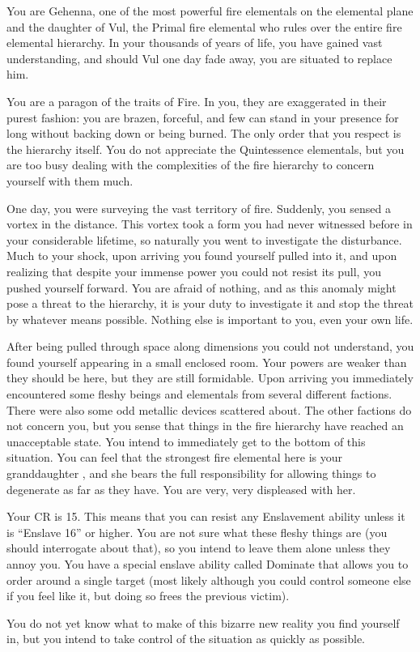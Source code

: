 \documentclass[green]{elementals}
\begin{document}
\name{\cElder{}}

You are Gehenna, one of the most powerful fire elementals on the elemental plane and the daughter of Vul, the Primal fire elemental who rules over the entire fire elemental hierarchy. In your thousands of years of life, you have gained vast understanding, and should Vul one day fade away, you are situated to replace him.

You are a paragon of the traits of Fire. In you, they are exaggerated in their purest fashion: you are brazen, forceful, and few can stand in your presence for long without backing down or being burned. The only order that you respect is the hierarchy itself. You do not appreciate the Quintessence elementals, but you are too busy dealing with the complexities of the fire hierarchy to concern yourself with them much.

One day, you were surveying the vast territory of fire. Suddenly, you sensed a vortex in the distance. This vortex took a form you had never witnessed before in your considerable lifetime, so naturally you went to investigate the disturbance. Much to your shock, upon arriving you found yourself pulled into it, and upon realizing that despite your immense power you could not resist its pull, you pushed yourself forward. You are afraid of nothing, and as this anomaly might pose a threat to the hierarchy, it is your duty to investigate it and stop the threat by whatever means possible. Nothing else is important to you, even your own life.

After being pulled through space along dimensions you could not understand, you found yourself appearing in a small enclosed room. Your powers are weaker than they should be here, but they are still formidable. Upon arriving you immediately encountered some fleshy beings and elementals from several different factions. There were also some odd metallic devices scattered about. The other factions do not concern you, but you sense that things in the fire hierarchy have reached an unacceptable state. You intend to immediately get to the bottom of this situation. You can feel that the strongest fire elemental here is your granddaughter \cQueen{\intro}, and she bears the full responsibility for allowing things to degenerate as far as they have. You are very, very displeased with her.

Your CR is 15. This means that you can resist any Enslavement ability unless it is ``Enslave 16'' or higher. You are not sure what these fleshy things are (you should interrogate \cQueen{} about that), so you intend to leave them alone unless they annoy you. You have a special enslave ability called Dominate that allows you to order around a single target (most likely \cQueen{} although you could control someone else if you feel like it, but doing so frees the previous victim).

You do not yet know what to make of this bizarre new reality you find yourself in, but you intend to take control of the situation as quickly as possible. 
\end{document}
